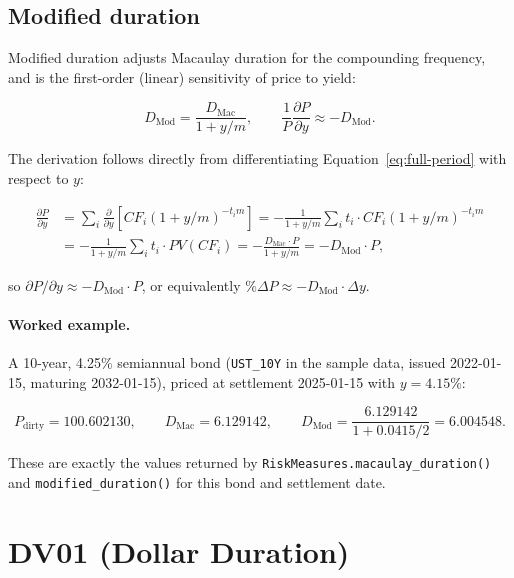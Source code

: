 \documentclass[11pt]{article}
\begin{document}
\subsection{Modified duration}

Modified duration adjusts Macaulay duration for the compounding frequency, and is the
first-order (linear) sensitivity of price to yield:

\begin{equation}
  D_{\text{Mod}} = \frac{D_{\text{Mac}}}{1 + y/m}, \qquad
  \frac{1}{P}\frac{\partial P}{\partial y} \approx -D_{\text{Mod}}.
  \label{eq:modified-duration}
\end{equation}

The derivation follows directly from differentiating Equation~\ref{eq:full-period} with
respect to $y$:

\begin{align}
  \frac{\partial P}{\partial y}
    &= \sum_i \frac{\partial}{\partial y}\left[CF_i (1+y/m)^{-t_i m}\right]
     = -\frac{1}{1+y/m}\sum_i t_i \cdot CF_i (1+y/m)^{-t_i m} \nonumber\\
    &= -\frac{1}{1+y/m}\sum_i t_i \cdot PV(CF_i)
     = -\frac{D_{\text{Mac}} \cdot P}{1+y/m}
     = -D_{\text{Mod}} \cdot P,
\end{align}

so $\partial P/\partial y \approx -D_{\text{Mod}} \cdot P$, or equivalently
$\%\Delta P \approx -D_{\text{Mod}} \cdot \Delta y$.

\paragraph{Worked example.} A 10-year, 4.25\% semiannual bond (\texttt{UST\_10Y} in the sample
data, issued 2022-01-15, maturing 2032-01-15), priced at settlement 2025-01-15 with $y =
4.15\%$:

\[
  P_{\text{dirty}} = 100.602130, \qquad
  D_{\text{Mac}} = 6.129142, \qquad
  D_{\text{Mod}} = \frac{6.129142}{1+0.0415/2} = 6.004548.
\]

These are exactly the values returned by \texttt{RiskMeasures.macaulay\_duration()} and
\texttt{modified\_duration()} for this bond and settlement date.

\section{DV01 (Dollar Duration)}
\label{sec:dv01}
\end{document}

